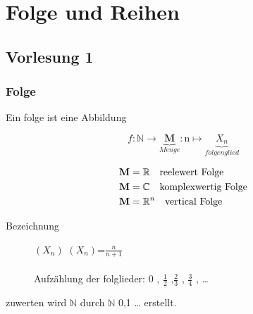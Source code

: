 \chapter{Folge und Reihen}
\section{Vorlesung 1}
\subsection{Folge}
\begin{definition}[Folgen]
    Ein folge ist eine Abbildung

    \[ f: \mathbb{N} \rightarrow \underbrace{\mathbf{M}}_{Menge} : \mathrm{n} \mapsto \underbrace{X_n}_{folgenglied} \]

\end{definition}
\begin{remark}

    \begin{align}	\mathbf{M} &= \mathbb{R} \quad \text{reelewert Folge} \notag \\
    \mathbf{M}&= \mathbb{C} \quad	\text{komplexwertig Folge}   \notag \\
    \mathbf{M}&= \mathbb{R}^n \quad \text{vertical Folge} \notag
    \end{align}




\end{remark}
\begin{description}

    \item[Bezeichnung]

    \quad $(X_n)$ \space {} \space $ \left( X_n   \right)$=$ \frac{n}{n+1} $
    \\ \\ Aufzählung der folglieder: 0 , $\frac{1}{2}$ ,$\frac{2}{3}$ , $\frac{3}{4}$ , \dots

\end{description}
\begin{remark}
    zuwerten wird $\mathbb{N}$ durch $\mathbb{N}$ {0,1 \dots} erstellt.


\end{remark}
